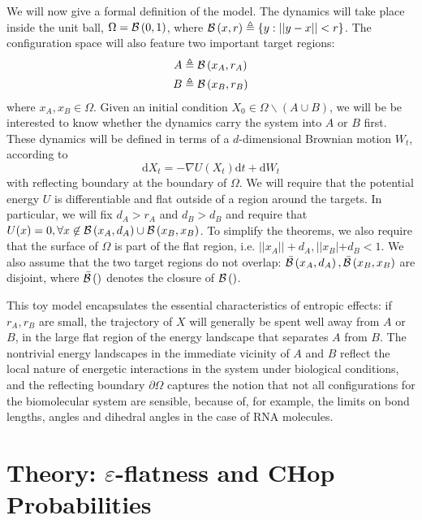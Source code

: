 \documentclass[english, aip, jcp, priprint, graphicx,floatfix]{revtex4-1}
\theoremstyle{plain}
\theoremstyle{definition}
\theoremstyle{plain}
\begin{document}
We will now give a formal definition of the model.  The dynamics will take place inside the unit ball, $\Omega = \mathcal{B}\left(0,1\right)$, where $\mathcal{B}\left(x, r\right) \triangleq \{ y : || y - x || < r \}$.  The configuration space will also feature two important target regions:
\begin{align*}
A &\triangleq \mathcal{B}\left(x_A, r_A\right)\\
B &\triangleq \mathcal{B}\left(x_B, r_B\right)
\end{align*}
where $x_A,x_B \in \Omega$.  Given an initial condition $X_0\in \Omega \backslash (A\cup B)$, we will be be interested to know whether the dynamics carry the system into $A$ or $B$ first.  These dynamics will be defined in terms of a $d$-dimensional Brownian motion $W_t$, according to 
\begin{equation} \label{equ:toy_sde}
\mathrm{d} X_t = - \nabla U (X_t) \mathrm{d} t + \mathrm{d} W_t 
\end{equation}
with reflecting boundary at the boundary of $\Omega$.  We will require that the potential energy $U$ is differentiable and flat outside of a region around the targets.  In particular, we will fix $d_A>r_A$ and $d_B>d_B$ and require that $U (x) = 0, \forall x \not\in \mathcal{B}\left(x_A,d_A\right) \cup \mathcal{B}\left(x_B,x_B\right)$.  To simplify the theorems, we also require that the surface of $\Omega$ is part of the flat region, i.e. $||x_A||+d_A,||x_B|+d_B<1$.  We also assume that the two target regions do not overlap: $\mathcal{\bar B}\left(x_A,d_A\right),\mathcal{\bar B}\left(x_B,x_B\right)$ are disjoint, where $\mathcal{\bar B}\left(\right)$ denotes the closure of $\mathcal{B}\left(\right)$.  

This toy model encapsulates the essential characteristics of entropic effects: if $r_A, r_B$ are small, the trajectory of $X$ will generally be spent well away from $A$ or $B$, in the large flat region of the energy landscape that separates $A$ from $B$. The nontrivial energy landscapes in the immediate vicinity of $A$ and $B$ reflect the local nature of energetic interactions in the system under biological conditions, and the reflecting boundary $\partial\Omega$ captures the notion that not all configurations for the biomolecular system are sensible, because of, for example, the limits on bond lengths, angles and dihedral angles in the case of RNA molecules.

\section{Theory: $\varepsilon$-flatness and CHop Probabilities}\label{sec:model_formulation}
\end{document}
